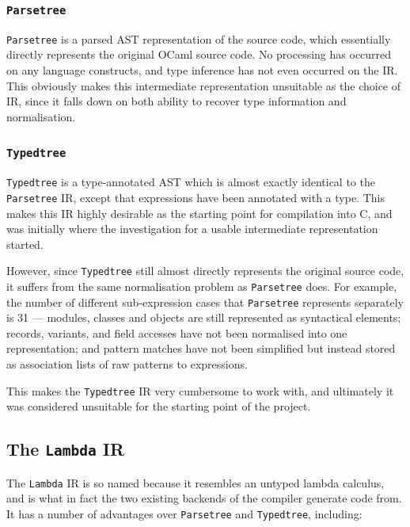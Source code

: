 \subsubsection{\texttt{Parsetree}}

\texttt{Parsetree} is a parsed AST representation of the source code, which 
essentially directly represents the original OCaml source code. No processing 
has occurred on any language constructs, and type inference has not even 
occurred on the IR. This obviously makes this intermediate representation 
unsuitable as the choice of IR, since it falls down on both ability to recover 
type information and normalisation.

\subsubsection{\texttt{Typedtree}}

\texttt{Typedtree} is a type-annotated AST which is almost exactly identical to 
the \texttt{Parsetree} IR, except that expressions have been annotated with a 
type. This makes this IR highly desirable as the starting point for compilation 
into C, and was initially where the investigation for a usable intermediate 
representation started.

However, since \texttt{Typedtree} still almost directly represents the original
source code, it suffers from the same normalisation problem as
\texttt{Parsetree} does. For example, the number of different sub-expression
cases that \texttt{Parsetree} represents separately is 31 --- modules, classes
and objects are still represented as syntactical elements; records, variants,
and field accesses have not been normalised into one representation; and pattern
matches have not been simplified but instead stored as association lists of raw
patterns to expressions.

This makes the \texttt{Typedtree} IR very cumbersome to work with, and 
ultimately it was considered unsuitable for the starting point of the project.

\subsection{The \texttt{Lambda} IR}

The \texttt{Lambda} IR is so named because it resembles an untyped lambda 
calculus, and is what in fact the two existing backends of the compiler 
generate code from. It has a number of advantages over \texttt{Parsetree} and 
\texttt{Typedtree}, including:

